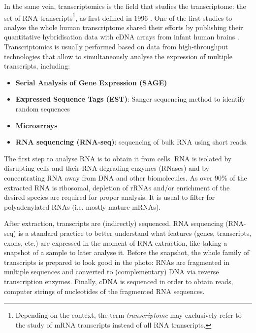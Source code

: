 In the same vein, transcriptomics is the field that studies the transcriptome: the set of RNA transcripts\footnote{Depending on the context, the term \emph{transcriptome} may exclusively refer to the study of mRNA transcripts instead of all RNA transcripts.}, as first defined in 1996 \cite{pietu:1999tl}. One of the first studies to analyse the whole human transcriptome shared their efforts by publishing their quantitative hybridisation data with cDNA arrays from infant human brains \cite{pietu:1999tl}. Transcriptomics is usually performed based on data from high-throughput technologies that allow to simultaneously analyse the expression of multiple transcripts, including:

\begin{itemize}
	\item \textbf{Serial Analysis of Gene Expression (SAGE)}
	\item \textbf{Expressed Sequence Tags (EST)}: Sanger sequencing method to identify random sequences
	\item \textbf{Microarrays}
	\item \textbf{RNA sequencing (RNA-seq)}: sequencing of bulk RNA using short reads.
\end{itemize}

The first step to analyse RNA is to obtain it from cells. RNA is isolated by disrupting cells and their RNA-degrading enzymes (RNases) and by concentrating RNA away from DNA and other biomolecules. As over 90\% of the extracted RNA is ribosomal, depletion of rRNAs and/or enrichment of the desired species are required for proper analysis. It is usual to filter for polyadenylated RNAs (i.e. mostly mature mRNAs).


After extraction, transcripts are (indirectly) sequenced. RNA sequencing (RNA-seq) is a standard practice to better understand what features (genes, transcripts, exons, etc.) are expressed in the moment of RNA extraction, like taking a snapshot of a sample to later analyse it. Before the snapshot, the whole family of transcripts is prepared to look good in the photo: RNAs are fragmented in multiple sequences and converted to (complementary) DNA via reverse transcription enzymes. Finally, cDNA is sequenced in order to obtain reads, computer strings of nucleotides of the fragmented RNA sequences.

